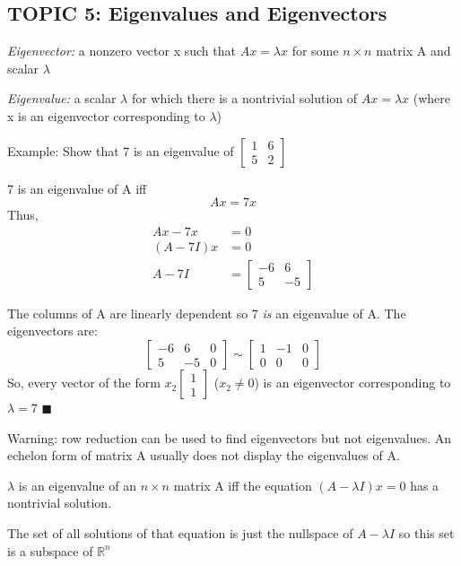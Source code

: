 \documentclass[12pt]{article} %
\newcommand{\R}{\mathbb{R}}
\begin{document}
\subsection{TOPIC 5: Eigenvalues and Eigenvectors}

\emph{Eigenvector:} a nonzero vector x such that $Ax = \lambda x$ for some $n \times n$ matrix A and scalar $\lambda$

\emph{Eigenvalue:} a scalar $\lambda$ for which there is a nontrivial solution of $Ax = \lambda x$ (where x is an eigenvector corresponding to $\lambda$)

Example: Show that 7 is an eigenvalue of $\begin{bmatrix}
	1 & 6\\
	5 & 2
\end{bmatrix}$

7 is an eigenvalue of A iff 
$$Ax = 7x$$
Thus, 
\begin{align*}
	Ax - 7x &= 0\\
	(A - 7I)x &= 0\\
	A - 7I &= \begin{bmatrix}
		-6 & 6\\
		5 & -5
	\end{bmatrix} 
\end{align*}

The columns of A are linearly dependent so 7 \emph{is} an eigenvalue of A. The eigenvectors are:
$$\begin{bmatrix}
	-6 & 6 & 0\\
	5 & -5 & 0
\end{bmatrix} \sim \begin{bmatrix}
	1 & -1 & 0\\
	0 & 0 & 0
\end{bmatrix}$$
So, every vector of the form $x_2 \begin{bmatrix}
	1 \\ 1
\end{bmatrix}$ ($x_2 \neq 0$) is an eigenvector corresponding to $\lambda = 7$ $\blacksquare$

Warning: row reduction can be used to find eigenvectors but not eigenvalues. An echelon form of matrix A usually does not display the eigenvalues of A. 

$\lambda$ is an eigenvalue of an $n \times n$ matrix A iff the equation $(A - \lambda I)x = 0$ has a nontrivial solution.

The set of all solutions of that equation is just the nullspace of $A - \lambda I$ so this set is a subspace of $\R^n$
\end{document}

